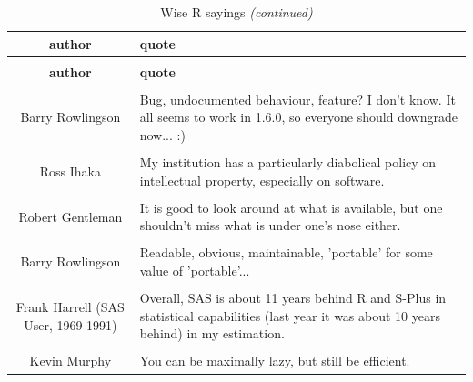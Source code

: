 \documentclass[
]{article}
\begin{document}
\begin{landscape}
\begin{longtable}[t]{c>{\centering\arraybackslash}p{50em}}
\caption{\label{tab:unnamed-chunk-14}Wise R sayings}\\
\toprule
\textbf{author} & \textbf{quote}\\
\midrule
\endfirsthead
\caption[]{Wise R sayings \textit{(continued)}}\\
\toprule
\textbf{author} & \textbf{quote}\\
\midrule
\endhead

\endfoot
\bottomrule
\endlastfoot
\cellcolor{gray!05}{Barry Rowlingson} & \cellcolor{gray!05}{Okay, let's stand up and be counted: who has been writing diamond graph code? Mine's 60 lines.}\\
Barry Rowlingson & Bug, undocumented behaviour, feature? I don't know. It all seems to work in 1.6.0, so everyone should downgrade now... :)\\
\cellcolor{gray!05}{Robert Gentleman} & \cellcolor{gray!05}{I'm always thrilled when people discover what lexical scoping really means.}\\
Ross Ihaka & My institution has a particularly diabolical policy on intellectual property, especially on software.\\
\cellcolor{gray!05}{Paul Murrell} & \cellcolor{gray!05}{If you imagine that this pen is Trellis, then Lattice is not this pen.}\\
Robert Gentleman & It is good to look around at what is available, but one shouldn't miss what is under one's nose either.\\
\cellcolor{gray!05}{Robert Gentleman} & \cellcolor{gray!05}{What we have is nice, but we need something very different.}\\
Barry Rowlingson & Readable, obvious, maintainable, 'portable' for some value of 'portable'...\\
\cellcolor{gray!05}{Brian D. Ripley} & \cellcolor{gray!05}{'They' did write documentation that told you that Perl was needed, but 'they' can't read it for you.}\\
Frank Harrell (SAS User, 1969-1991) & Overall, SAS is about 11 years behind R and S-Plus in statistical capabilities (last year it was about 10 years behind) in my estimation.\\
\cellcolor{gray!05}{Peter Dalgaard} & \cellcolor{gray!05}{I want a budget.}\\
Kevin Murphy & You can be maximally lazy, but still be efficient.\\

\end{longtable}
\end{landscape}
\end{document}
